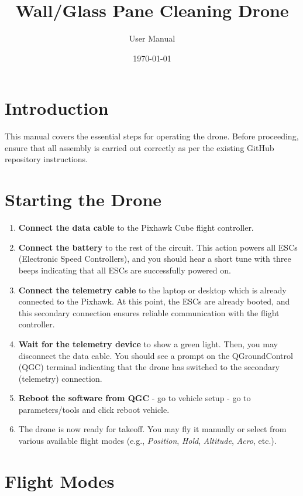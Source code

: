 \documentclass[12pt,a4paper]{article}
\begin{document}
\title{Wall/Glass Pane Cleaning Drone}
\author{User Manual}
\date{\today}

\maketitle

\section{Introduction}
This manual covers the essential steps for operating the drone. Before proceeding, ensure that all assembly is carried out correctly as per the existing GitHub repository instructions. 

\section{Starting the Drone}
\begin{enumerate}
    \item \textbf{Connect the data cable} to the Pixhawk Cube flight controller.
    \item \textbf{Connect the battery} to the rest of the circuit. This action powers all ESCs (Electronic Speed Controllers), and you should hear a short tune with three beeps indicating that all ESCs are successfully powered on.
    \item \textbf{Connect the telemetry cable} to the laptop or desktop which is already connected to the Pixhawk. At this point, the ESCs are already booted, and this secondary connection ensures reliable communication with the flight controller.
    \item \textbf{Wait for the telemetry device} to show a green light. Then, you may disconnect the data cable. You should see a prompt on the QGroundControl (QGC) terminal indicating that the drone has switched to the secondary (telemetry) connection.
    \item \textbf{Reboot the software from QGC} - go to vehicle setup - go to parameters/tools and click reboot vehicle.
    \item The drone is now ready for takeoff. You may fly it manually or select from various available flight modes (e.g., \textit{Position}, \textit{Hold}, \textit{Altitude}, \textit{Acro}, etc.).
\end{enumerate}

\section{Flight Modes}
\end{document}
